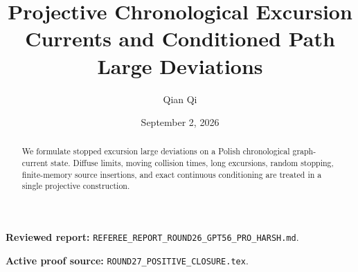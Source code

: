 \documentclass[11pt,reqno]{amsart}
\title[A3 Round 27 revision]{Projective Chronological Excursion Currents and Conditioned Path Large Deviations}
\author{Qian Qi}
\date{September 2, 2026}
\begin{document}
\begin{abstract}We formulate stopped excursion large deviations on a Polish chronological graph-current state. Diffuse limits, moving collision times, long excursions, random stopping, finite-memory source insertions, and exact continuous conditioning are treated in a single projective construction.\end{abstract}
\maketitle
\noindent\textbf{Reviewed report:} \texttt{REFEREE\_REPORT\_ROUND26\_GPT56\_PRO\_HARSH.md}.\par
\noindent\textbf{Active proof source:} \texttt{ROUND27\_POSITIVE\_CLOSURE.tex}.\par

\end{document}
